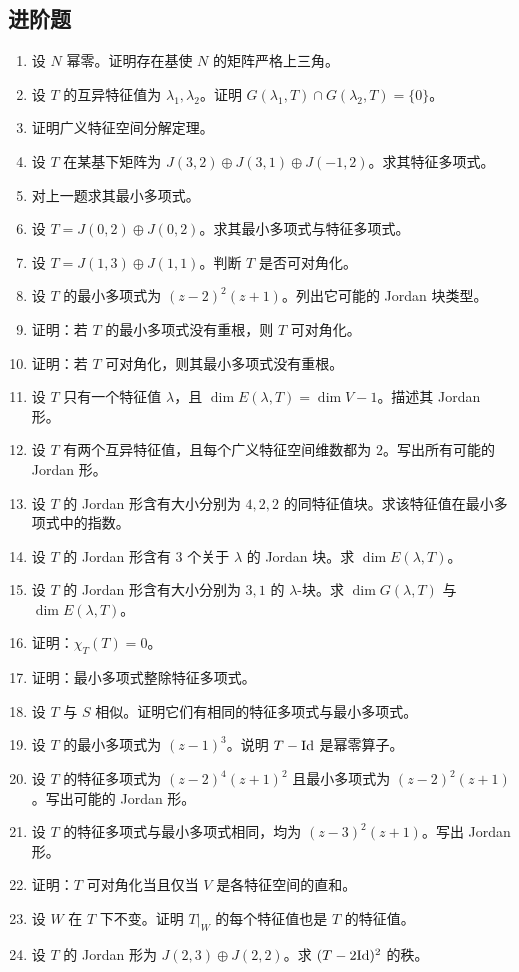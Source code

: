 \subsection*{进阶题}
\begin{enumerate}[resume, label=\textbf{\arabic*.}, leftmargin=*, itemsep=0.5em]
\item \medium 设 $N$ 幂零。证明存在基使 $N$ 的矩阵严格上三角。
\item \medium 设 $T$ 的互异特征值为 $\lambda_1,\lambda_2$。证明 $G(\lambda_1,T)\cap G(\lambda_2,T)=\{0\}$。
\item \medium 证明广义特征空间分解定理。
\item \medium 设 $T$ 在某基下矩阵为 $J(3,2)\oplus J(3,1)\oplus J(-1,2)$。求其特征多项式。
\item \medium 对上一题求其最小多项式。
\item \medium 设 $T=J(0,2)\oplus J(0,2)$。求其最小多项式与特征多项式。
\item \medium 设 $T=J(1,3)\oplus J(1,1)$。判断 $T$ 是否可对角化。
\item \medium 设 $T$ 的最小多项式为 $(z-2)^2(z+1)$。列出它可能的 Jordan 块类型。
\item \medium 证明：若 $T$ 的最小多项式没有重根，则 $T$ 可对角化。
\item \medium 证明：若 $T$ 可对角化，则其最小多项式没有重根。
\item \medium 设 $T$ 只有一个特征值 $\lambda$，且 $\dim E(\lambda,T)=\dim V-1$。描述其 Jordan 形。
\item \medium 设 $T$ 有两个互异特征值，且每个广义特征空间维数都为 $2$。写出所有可能的 Jordan 形。
\item \medium 设 $T$ 的 Jordan 形含有大小分别为 $4,2,2$ 的同特征值块。求该特征值在最小多项式中的指数。
\item \medium 设 $T$ 的 Jordan 形含有 $3$ 个关于 $\lambda$ 的 Jordan 块。求 $\dim E(\lambda,T)$。
\item \medium 设 $T$ 的 Jordan 形含有大小分别为 $3,1$ 的 $\lambda$-块。求 $\dim G(\lambda,T)$ 与 $\dim E(\lambda,T)$。
\item \medium 证明：$\chi_T(T)=0$。
\item \medium 证明：最小多项式整除特征多项式。
\item \medium 设 $T$ 与 $S$ 相似。证明它们有相同的特征多项式与最小多项式。
\item \medium 设 $T$ 的最小多项式为 $(z-1)^3$。说明 $T-\mathrm{Id}$ 是幂零算子。
\item \medium 设 $T$ 的特征多项式为 $(z-2)^4(z+1)^2$ 且最小多项式为 $(z-2)^2(z+1)$。写出可能的 Jordan 形。
\item \medium 设 $T$ 的特征多项式与最小多项式相同，均为 $(z-3)^2(z+1)$。写出 Jordan 形。
\item \medium 证明：$T$ 可对角化当且仅当 $V$ 是各特征空间的直和。
\item \medium 设 $W$ 在 $T$ 下不变。证明 $T|_W$ 的每个特征值也是 $T$ 的特征值。
\item \medium 设 $T$ 的 Jordan 形为 $J(2,3)\oplus J(2,2)$。求 $(T-2\mathrm{Id})^2$ 的秩。
\end{enumerate}

